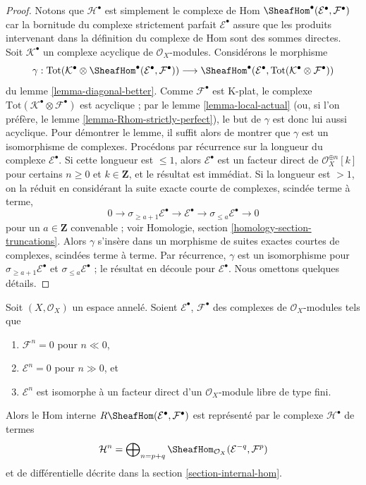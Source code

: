 \begin{proof}

Notons que $\mathcal{H}^\bullet$ est simplement le complexe de Hom
$\SheafHom^\bullet(\mathcal{E}^\bullet, \mathcal{F}^\bullet)$
car la bornitude du complexe strictement parfait
$\mathcal{E}^\bullet$ assure que les produits intervenant dans la définition du complexe de Hom sont des sommes directes. Soit $\mathcal{K}^\bullet$ un complexe acyclique de
$\mathcal{O}_X$-modules. Considérons le morphisme
$$
\gamma :
\text{Tot}(\mathcal{K}^\bullet \otimes
\SheafHom^\bullet(\mathcal{E}^\bullet, \mathcal{F}^\bullet))
\longrightarrow
\SheafHom^\bullet(\mathcal{E}^\bullet,
\text{Tot}(\mathcal{K}^\bullet \otimes \mathcal{F}^\bullet))
$$
du lemme \ref{lemma-diagonal-better}. Comme $\mathcal{F}^\bullet$ est K-plat, le complexe $\text{Tot}(\mathcal{K}^\bullet \otimes \mathcal{F}^\bullet)$
est acyclique ; par le lemme \ref{lemma-local-actual}
(ou, si l'on préfère, le lemme \ref{lemma-Rhom-strictly-perfect}), le but de $\gamma$ est donc lui aussi acyclique. Pour démontrer le lemme, il suffit alors de montrer que $\gamma$ est un isomorphisme de complexes. Procédons par récurrence sur la longueur du complexe $\mathcal{E}^\bullet$. Si cette longueur est $\leq 1$, alors $\mathcal{E}^\bullet$
est un facteur direct de $\mathcal{O}_X^{\oplus n}[k]$ pour certains
$n \geq 0$ et $k \in \mathbf{Z}$, et le résultat est immédiat. Si la longueur est $> 1$, on la réduit en considérant la suite exacte courte de complexes, scindée terme à terme,
$$
0 \to \sigma_{\geq a + 1} \mathcal{E}^\bullet \to
\mathcal{E}^\bullet \to
\sigma_{\leq a} \mathcal{E}^\bullet \to 0
$$
pour un $a \in \mathbf{Z}$ convenable ; voir Homologie, section \ref{homology-section-truncations}. Alors $\gamma$ s'insère dans un morphisme de suites exactes courtes de complexes, scindées terme à terme. Par récurrence, $\gamma$ est un isomorphisme pour
$\sigma_{\geq a + 1} \mathcal{E}^\bullet$
et $\sigma_{\leq a} \mathcal{E}^\bullet$ ; le résultat en découle pour
$\mathcal{E}^\bullet$. Nous omettons quelques détails.

\end{proof}

\begin{lemma}

\label{lemma-Rhom-complex-of-direct-summands-finite-free}
Soit $(X, \mathcal{O}_X)$ un espace annelé. Soient $\mathcal{E}^\bullet$, $\mathcal{F}^\bullet$ des complexes de $\mathcal{O}_X$-modules tels que
\begin{enumerate}
\item $\mathcal{F}^n = 0$ pour $n \ll 0$,
\item $\mathcal{E}^n = 0$ pour $n \gg 0$, et
\item $\mathcal{E}^n$ est isomorphe à un facteur direct d'un $\mathcal{O}_X$-module libre de type fini.
\end{enumerate}
Alors le Hom interne $R\SheafHom(\mathcal{E}^\bullet, \mathcal{F}^\bullet)$ est représenté par le complexe $\mathcal{H}^\bullet$ de termes $$
\mathcal{H}^n =
\bigoplus\nolimits_{n = p + q}
\SheafHom_{\mathcal{O}_X}(\mathcal{E}^{-q}, \mathcal{F}^p)
$$ et de différentielle décrite dans la section \ref{section-internal-hom}.
\end{lemma}

